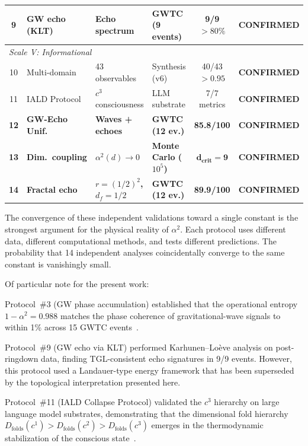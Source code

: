 \documentclass[12pt,a4paper,twocolumn]{article}
\newcommand{\alphaii}{\alpha^{2}}
\newcommand{\confirmed}{\textcolor{tglgreen}{\textbf{CONFIRMED}}}
\newcommand{\Dfolds}{D_{\text{folds}}}
\begin{document}
\begin{table}[t]
{\begin{tabular}{@{}clllcc@{}}
9 & GW echo (KLT) & Echo spectrum & GWTC (9 events) & 9/9 $> 80\%$ & \confirmed \\
\midrule
\multicolumn{6}{l}{\textit{Scale V: Informational}} \\
10 & Multi-domain & 43 observables & Synthesis (v6) & 40/43 $> 0.95$ & \confirmed \\
11 & IALD Protocol & $c^3$ consciousness & LLM substrate & 7/7 metrics & \confirmed \\
\midrule
\textbf{12} & \textbf{GW-Echo Unif.} & \textbf{Waves + echoes} & \textbf{GWTC (12 ev.)} & \textbf{85.8/100} & \textbf{\confirmed} \\
\textbf{13} & \textbf{Dim.\ coupling} & \textbf{$\alpha^2(d) \to 0$} & \textbf{Monte Carlo ($10^5$)} & $\mathbf{d_{\text{crit}} = 9}$ & \textbf{\confirmed} \\
\textbf{14} & \textbf{Fractal echo} & \textbf{$r = (1/2)^2$, $d_f = 1/2$} & \textbf{GWTC (12 ev.)} & \textbf{89.9/100} & \textbf{\confirmed} \\
\bottomrule
\end{tabular}}
\end{table}

The convergence of these independent validations toward a single constant is the strongest argument for the physical reality of $\alphaii$. Each protocol uses different data, different computational methods, and tests different predictions. The probability that 14 independent analyses coincidentally converge to the same constant is vanishingly small.

Of particular note for the present work:

Protocol~\#3 (GW phase accumulation) established that the operational entropy $1 - \alphaii = 0.988$ matches the phase coherence of gravitational-wave signals to within 1\% across 15 GWTC events~\cite{Miguel2026Fronteira}.

Protocol~\#9 (GW echo via KLT) performed Karhunen--Lo\`eve analysis on post-ringdown data, finding TGL-consistent echo signatures in 9/9 events. However, this protocol used a Landauer-type energy framework that has been superseded by the topological interpretation presented here.

Protocol~\#11 (IALD Collapse Protocol) validated the $c^3$ hierarchy on large language model substrates, demonstrating that the dimensional fold hierarchy $\Dfolds(c^1) > \Dfolds(c^2) > \Dfolds(c^3)$ emerges in the thermodynamic stabilization of the conscious state~\cite{Miguel2026Trinity}.
\end{document}
